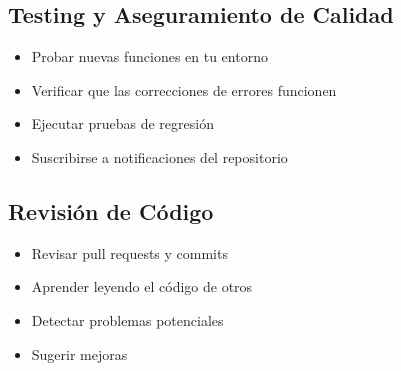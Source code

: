 \documentclass{presentacion}
\begin{document}
\subsection{Testing y Aseguramiento de Calidad}
\begin{frame}
    \begin{itemize}[<+->]
        \item Probar nuevas funciones en tu entorno
        \item Verificar que las correcciones de errores funcionen
        \item Ejecutar pruebas de regresión
        \item Suscribirse a notificaciones del repositorio
    \end{itemize}
    
    \vspace{1em}
\end{frame}

\subsection{Revisión de Código}
\begin{frame}
    \begin{itemize}[<+->]
        \item Revisar pull requests y commits
        \item Aprender leyendo el código de otros
        \item Detectar problemas potenciales
        \item Sugerir mejoras
    \end{itemize}
    
    \vspace{1em}
\end{frame}
\end{document}
